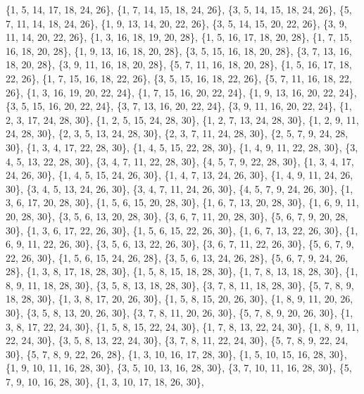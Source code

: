 \documentclass[11pt,a4paper]{article}
\begin{document}
{\{1, 5, 14, 17, 18, 24, 26\}, \{1, 7, 14, 15, 18, 24, 26\}, \{3, 5, 14, 15, 18, 24, 26\}, \{5, 7, 11, 14, 18, 24, 26\}, \{1, 9, 13, 14, 20, 22, 26\},
\{3, 5, 14, 15, 20, 22, 26\}, \{3, 9, 11, 14, 20, 22, 26\}, \{1, 3, 16, 18, 19, 20, 28\}, \{1, 5, 16, 17, 18, 20, 28\}, \{1, 7, 15, 16, 18, 20, 28\},
\{1, 9, 13, 16, 18, 20, 28\}, \{3, 5, 15, 16, 18, 20, 28\}, \{3, 7, 13, 16, 18, 20, 28\}, \{3, 9, 11, 16, 18, 20, 28\}, \{5, 7, 11, 16, 18, 20, 28\},
\{1, 5, 16, 17, 18, 22, 26\}, \{1, 7, 15, 16, 18, 22, 26\}, \{3, 5, 15, 16, 18, 22, 26\}, \{5, 7, 11, 16, 18, 22, 26\}, \{1, 3, 16, 19, 20, 22, 24\},
\{1, 7, 15, 16, 20, 22, 24\}, \{1, 9, 13, 16, 20, 22, 24\}, \{3, 5, 15, 16, 20, 22, 24\}, \{3, 7, 13, 16, 20, 22, 24\}, \{3, 9, 11, 16, 20, 22, 24\},
\{1, 2, 3, 17, 24, 28, 30\}, \{1, 2, 5, 15, 24, 28, 30\}, \{1, 2, 7, 13, 24, 28, 30\}, \{1, 2, 9, 11, 24, 28, 30\}, \{2, 3, 5, 13, 24, 28, 30\},
\{2, 3, 7, 11, 24, 28, 30\}, \{2, 5, 7, 9, 24, 28, 30\}, \{1, 3, 4, 17, 22, 28, 30\}, \{1, 4, 5, 15, 22, 28, 30\}, \{1, 4, 9, 11, 22, 28, 30\},
\{3, 4, 5, 13, 22, 28, 30\}, \{3, 4, 7, 11, 22, 28, 30\}, \{4, 5, 7, 9, 22, 28, 30\}, \{1, 3, 4, 17, 24, 26, 30\}, \{1, 4, 5, 15, 24, 26, 30\},
\{1, 4, 7, 13, 24, 26, 30\}, \{1, 4, 9, 11, 24, 26, 30\}, \{3, 4, 5, 13, 24, 26, 30\}, \{3, 4, 7, 11, 24, 26, 30\}, \{4, 5, 7, 9, 24, 26, 30\},
\{1, 3, 6, 17, 20, 28, 30\}, \{1, 5, 6, 15, 20, 28, 30\}, \{1, 6, 7, 13, 20, 28, 30\}, \{1, 6, 9, 11, 20, 28, 30\}, \{3, 5, 6, 13, 20, 28, 30\},
\{3, 6, 7, 11, 20, 28, 30\}, \{5, 6, 7, 9, 20, 28, 30\}, \{1, 3, 6, 17, 22, 26, 30\}, \{1, 5, 6, 15, 22, 26, 30\}, \{1, 6, 7, 13, 22, 26, 30\},
\{1, 6, 9, 11, 22, 26, 30\}, \{3, 5, 6, 13, 22, 26, 30\}, \{3, 6, 7, 11, 22, 26, 30\}, \{5, 6, 7, 9, 22, 26, 30\}, \{1, 5, 6, 15, 24, 26, 28\},
\{3, 5, 6, 13, 24, 26, 28\}, \{5, 6, 7, 9, 24, 26, 28\}, \{1, 3, 8, 17, 18, 28, 30\}, \{1, 5, 8, 15, 18, 28, 30\}, \{1, 7, 8, 13, 18, 28, 30\},
\{1, 8, 9, 11, 18, 28, 30\}, \{3, 5, 8, 13, 18, 28, 30\}, \{3, 7, 8, 11, 18, 28, 30\}, \{5, 7, 8, 9, 18, 28, 30\}, \{1, 3, 8, 17, 20, 26, 30\},
\{1, 5, 8, 15, 20, 26, 30\}, \{1, 8, 9, 11, 20, 26, 30\}, \{3, 5, 8, 13, 20, 26, 30\}, \{3, 7, 8, 11, 20, 26, 30\}, \{5, 7, 8, 9, 20, 26, 30\},
\{1, 3, 8, 17, 22, 24, 30\}, \{1, 5, 8, 15, 22, 24, 30\}, \{1, 7, 8, 13, 22, 24, 30\}, \{1, 8, 9, 11, 22, 24, 30\}, \{3, 5, 8, 13, 22, 24, 30\},
\{3, 7, 8, 11, 22, 24, 30\}, \{5, 7, 8, 9, 22, 24, 30\}, \{5, 7, 8, 9, 22, 26, 28\}, \{1, 3, 10, 16, 17, 28, 30\}, \{1, 5, 10, 15, 16, 28, 30\},
\{1, 9, 10, 11, 16, 28, 30\}, \{3, 5, 10, 13, 16, 28, 30\}, \{3, 7, 10, 11, 16, 28, 30\}, \{5, 7, 9, 10, 16, 28, 30\}, \{1, 3, 10, 17, 18, 26, 30\},
}
\end{document}
